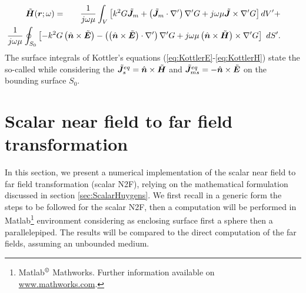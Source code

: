 \begin{eqnarray}
\label{eq:KottlerH}
\tilde{\mbfit{H}}(\mbfit{r}; \omega) &= & \frac{1}{j \omega \mu} \int_V \left [ k^2 G \tilde{\mbfit{J}}_m + \left ( \tilde{\mbfit{J}}_m \cdot {\nabla}' \right )  {\nabla}' G + j \omega \mu \tilde{\mbfit{J}}  \times {\nabla}' G \right ] dV' + \nonumber \\
& & \hspace{-2.75cm} \frac{1}{j \omega \mu} \oint_{S_0} \left [ - k^2 G \left ( \hat{\mbfit{n}} \times \tilde{\mbfit{E}} \right ) - \left ( \left ( \hat{\mbfit{n}} \times \tilde{\mbfit{E}} \right ) \cdot {\nabla}' \right ) {\nabla}' G + j \omega \mu \left ( \hat{\mbfit{n}} \times \tilde{\mbfit{H}} \right ) \times {\nabla}' G \right ] \ dS'.
\end{eqnarray} The surface integrals of Kottler's equations (\ref{eq:KottlerE}-\ref{eq:KottlerH}) state the so-called  \cite{RothwellCloudE} while considering the  $\tilde{\mbfit{J}}_s^{eq} =  \hat{\mbfit{n}} \times \tilde{\mbfit{H}}$ and $\tilde{\mbfit{J}}_{ms}^{eq} = - \hat{\mbfit{n}} \times \tilde{\mbfit{E}}$ on the bounding surface $S_0$.

\section{Scalar near field to far field transformation} \label{sec:ScalarN2F}

\par In this section, we present a numerical implementation of the scalar near field to far field transformation (scalar N2F), relying on the mathematical formulation discussed in section \ref{sec:ScalarHuygens}. We first recall in a generic form the steps to be followed for the scalar N2F, then a computation will be performed in Matlab\footnote{Matlab${}^{\copyright}$ Mathworks. Further information available on \url{www.mathworks.com}.} environment considering as enclosing surface first a sphere then a parallelepiped. The results will be compared to the direct computation of the far fields, assuming an unbounded medium.
